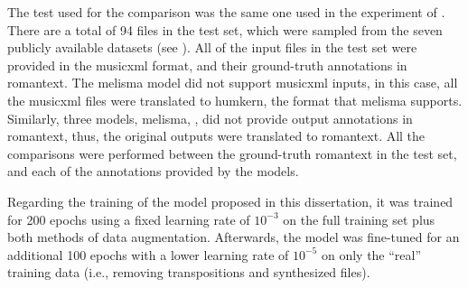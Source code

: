 
The test used for the comparison was the same one used in
the experiment of .
There are a total of 94 files in the test set, which were
sampled from the seven publicly available datasets (see
). All of the input files
in the test set were provided in the \gls{musicxml} format,
and their ground-truth annotations in \gls{romantext}. The
\gls{melisma} model did not support \gls{musicxml} inputs,
in this case, all the \gls{musicxml} files were translated
to \gls{humkern}, the format that \gls{melisma} supports.
Similarly, three models, \gls{melisma},
\textcite{chen2021attend, mcleod2021modular}, did not
provide output annotations in \gls{romantext}, thus, the
original outputs were translated to \gls{romantext}. All the
comparisons were performed between the ground-truth
\gls{romantext} in the test set, and each of the annotations
provided by the models. 

Regarding the training of the model proposed in this
dissertation, it was trained for 200 epochs using a fixed
learning rate of $10^{-3}$ on the full training set plus
both methods of data augmentation. Afterwards, the model was
fine-tuned for an additional 100 epochs with a lower
learning rate of $10^{-5}$ on only the ``real'' training
data (i.e., removing transpositions and synthesized files).

